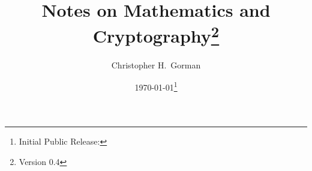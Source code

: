 
\newcommand*{\Author}[0]{Christopher H.~Gorman}
\newcommand*{\Title}[0]{Notes on Mathematics and Cryptography}






\author{\Author{}}
\title{\Title{}\thanks{Version 0.4}}
\date{\today\thanks{Initial Public Release: }}


